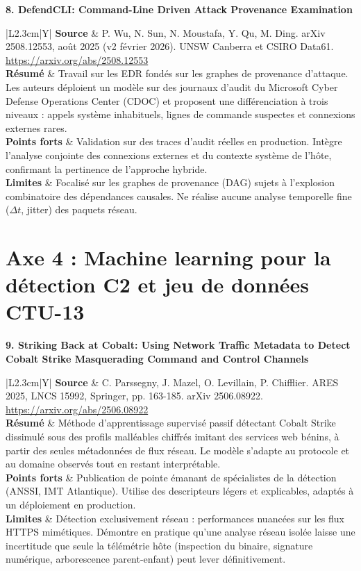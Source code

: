 \documentclass[10pt,a4paper]{article}
\newcommand{\articlecard}[5]{
    \noindent\textbf{#1}\par\vspace{1.2mm}
    \noindent\begin{tabularx}{\textwidth}{|L{2.3cm}|Y|}
        \hline
        \textbf{Source} & #2 \\ \hline
        \textbf{Résumé} & #3 \\ \hline
        \textbf{Points forts} & #4 \\ \hline
        \textbf{Limites} & #5 \\ \hline
    \end{tabularx}
    \vspace{3.5mm}
}
\begin{document}
\articlecard{8. DefendCLI: Command-Line Driven Attack Provenance Examination}{
P. Wu, N. Sun, N. Moustafa, Y. Qu, M. Ding. arXiv 2508.12553, août 2025 (v2 février 2026). UNSW Canberra et CSIRO Data61.\newline
\url{https://arxiv.org/abs/2508.12553}
}{
Travail sur les EDR fondés sur les graphes de provenance d'attaque. Les auteurs déploient un modèle sur des journaux d'audit du Microsoft Cyber Defense Operations Center (CDOC) et proposent une différenciation à trois niveaux : appels système inhabituels, lignes de commande suspectes et connexions externes rares.
}{
Validation sur des traces d'audit réelles en production. Intègre l'analyse conjointe des connexions externes et du contexte système de l'hôte, confirmant la pertinence de l'approche hybride.
}{
Focalisé sur les graphes de provenance (DAG) sujets à l'explosion combinatoire des dépendances causales. Ne réalise aucune analyse temporelle fine ($\Delta t$, jitter) des paquets réseau.
}

\section*{Axe 4 : Machine learning pour la détection C2 et jeu de données CTU-13}

\articlecard{9. Striking Back at Cobalt: Using Network Traffic Metadata to Detect Cobalt Strike Masquerading Command and Control Channels}{
C. Parssegny, J. Mazel, O. Levillain, P. Chifflier. ARES 2025, LNCS 15992, Springer, pp. 163-185. arXiv 2506.08922.\newline
\url{https://arxiv.org/abs/2506.08922}
}{
Méthode d'apprentissage supervisé passif détectant Cobalt Strike dissimulé sous des profils malléables chiffrés imitant des services web bénins, à partir des seules métadonnées de flux réseau. Le modèle s'adapte au protocole et au domaine observés tout en restant interprétable.
}{
Publication de pointe émanant de spécialistes de la détection (ANSSI, IMT Atlantique). Utilise des descripteurs légers et explicables, adaptés à un déploiement en production.
}{
Détection exclusivement réseau : performances nuancées sur les flux HTTPS mimétiques. Démontre en pratique qu'une analyse réseau isolée laisse une incertitude que seule la télémétrie hôte (inspection du binaire, signature numérique, arborescence parent-enfant) peut lever définitivement.
}

\newpage
\end{document}
